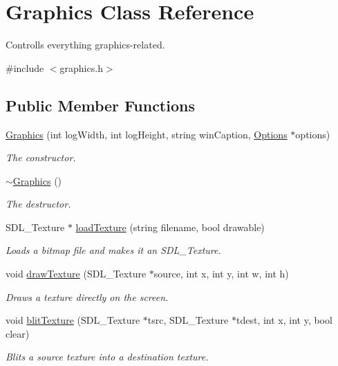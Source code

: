 \hypertarget{class_graphics}{\section{Graphics Class Reference}
\label{class_graphics}
}


Controlls everything graphics-\/related.  




{\ttfamily \#include $<$graphics.\-h$>$}

\subsection*{Public Member Functions}
\begin{DoxyCompactItemize}
\item 
\hyperlink{class_graphics_a6a0d98b9552ff541d543ff5f56759410}{Graphics} (int log\-Width, int log\-Height, string win\-Caption, \hyperlink{class_options}{Options} $\ast$options)
\begin{DoxyCompactList}\small\item\em The constructor. \end{DoxyCompactList}\item 
\hyperlink{class_graphics_a7841c9a961ac9bca33bd30ddf8066cdb}{$\sim$\-Graphics} ()
\begin{DoxyCompactList}\small\item\em The destructor. \end{DoxyCompactList}\item 
S\-D\-L\-\_\-\-Texture $\ast$ \hyperlink{class_graphics_ae584d38c352d13cf792d91bd3b1f2804}{load\-Texture} (string filename, bool drawable)
\begin{DoxyCompactList}\small\item\em Loads a bitmap file and makes it an S\-D\-L\-\_\-\-Texture. \end{DoxyCompactList}\item 
void \hyperlink{class_graphics_abd63e855ce736b83c931a40257741145}{draw\-Texture} (S\-D\-L\-\_\-\-Texture $\ast$source, int x, int y, int w, int h)
\begin{DoxyCompactList}\small\item\em Draws a texture directly on the screen. \end{DoxyCompactList}\item 
void \hyperlink{class_graphics_a84c6ec14161fd77ab529f3f985067df2}{blit\-Texture} (S\-D\-L\-\_\-\-Texture $\ast$tsrc, S\-D\-L\-\_\-\-Texture $\ast$tdest, int x, int y, bool clear)
\begin{DoxyCompactList}\small\item\em Blits a source texture into a destination texture. \end{DoxyCompactList}\item 

\end{DoxyCompactItemize}
